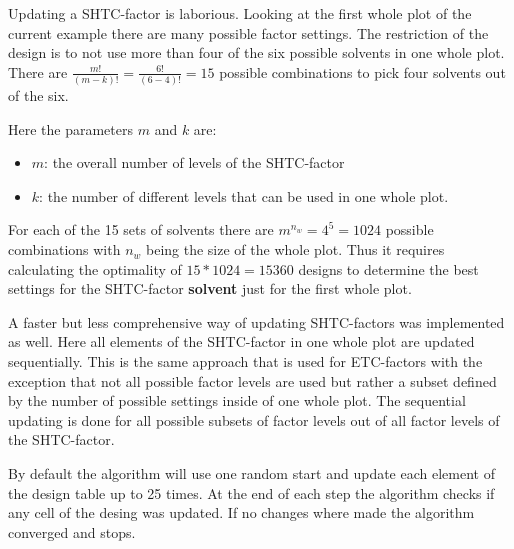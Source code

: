 Updating a SHTC-factor is laborious. Looking at the first whole plot of the current example there are many possible factor settings. The restriction of the design is to not use more than four of the six possible solvents in one whole plot. There are $\frac{m!}{(m-k)!} = \frac{6!}{(6-4)!} = 15$ possible combinations to pick four solvents out of the six. 

Here the parameters $m$ and $k$ are:

\begin{itemize}
	\item $m$: the overall number of levels of the SHTC-factor
	\item $k$: the number of different levels that can be used in one whole plot.
\end{itemize}

For each of the 15 sets of solvents there are $m^{n_w} = 4^5 = 1024$ possible combinations with $n_w$ being the size of the whole plot. Thus it requires calculating the optimality of $15*1024=15360$ designs to determine the best settings for the SHTC-factor \textbf{solvent} just for the first whole plot.

A faster but less comprehensive way of updating SHTC-factors was implemented as well. Here all elements of the SHTC-factor in one whole plot are updated sequentially. This is the same approach that is used for ETC-factors with the exception that not all possible factor levels are used but rather a subset defined by the number of possible settings inside of one whole plot. The sequential updating is done for all possible subsets of factor levels out of all factor levels of the SHTC-factor.

By default the algorithm will use one random start and update each element of the design table up to 25 times. At the end of each step the algorithm checks if any cell of the desing was updated. If no changes where made the algorithm converged and stops.
